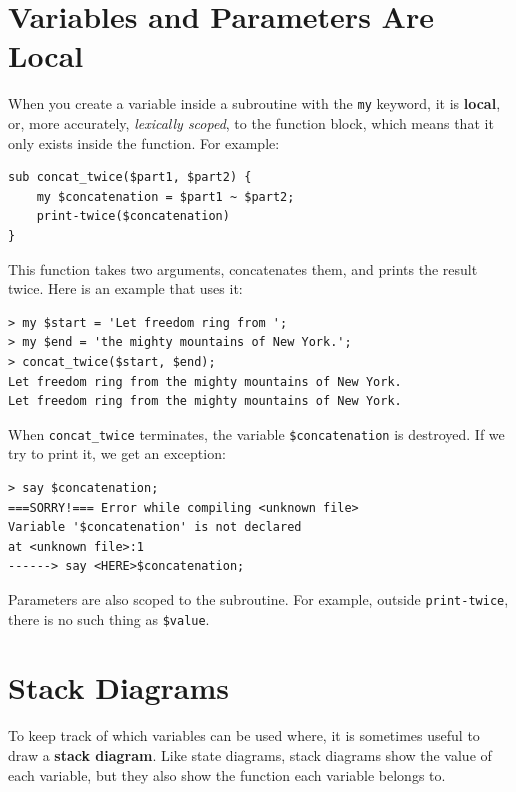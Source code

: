 \section{Variables and Parameters Are Local}
\label{localvar}

When you create a variable inside a subroutine with the 
{\tt my} keyword, it is {\bf local}, or, more accurately, 
\emph{lexically scoped}, to the function block, which means 
that it only exists inside the function.  For example:

\begin{verbatim}
sub concat_twice($part1, $part2) {
    my $concatenation = $part1 ~ $part2;
    print-twice($concatenation)
}
\end{verbatim}
%
This function takes two arguments, concatenates them, and prints
the result twice.  Here is an example that uses it:

\begin{verbatim}
> my $start = 'Let freedom ring from ';
> my $end = 'the mighty mountains of New York.';
> concat_twice($start, $end);
Let freedom ring from the mighty mountains of New York.
Let freedom ring from the mighty mountains of New York.
\end{verbatim}
%
When \verb"concat_twice" terminates, the variable \verb"$concatenation" 
is destroyed.  If we try to print it, we get an exception:

\begin{verbatim}
> say $concatenation;
===SORRY!=== Error while compiling <unknown file>
Variable '$concatenation' is not declared
at <unknown file>:1
------> say <HERE>$concatenation;
\end{verbatim}
%
Parameters are also scoped to the subroutine.
For example, outside \verb"print-twice", there is no
such thing as \verb"$value".


\section{Stack Diagrams}
\label{stackdiagram}

To keep track of which variables can be used where, it is sometimes
useful to draw a {\bf stack diagram}.  Like state diagrams, stack
diagrams show the value of each variable, but they also show the
function each variable belongs to.

